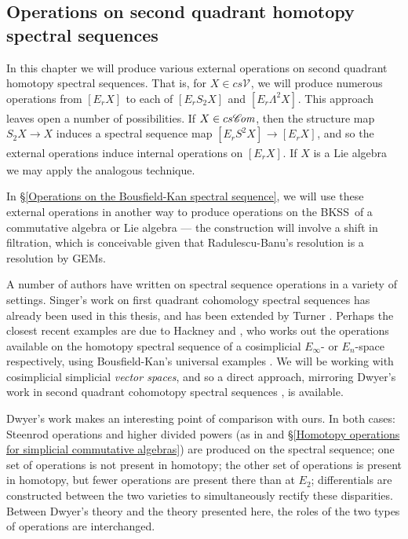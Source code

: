 \documentclass[11pt]{amsart} \renewcommand{\baselinestretch}{1.2}
\theoremstyle{plain}
\numberwithin{equation}{section} %
\theoremstyle{plain}
\numberwithin{equation}{chapter} %
\renewcommand{\to}{\longrightarrow}
\newcommand{\scrC}{\mathscr{C}}
\newcommand{\calV}{\mathcal{V}}
\newcommand{\vect}[2]{\calV^{#1}_{#2}}
\newcommand{\ExtCohOp}{\mathrm{Sq}_\mathrm{ext}}
\newcommand{\hExtCohOp}{\mathrm{Sq}_\mathrm{h,ext}}
\newcommand{\algs}{{\scrC\!\textit{\normalfont\textit{om}}}}
\newcommand{\E}[5]{[E^{#1}_{#2}#3]^{#4}_{#5}}
\newcommand{\uver}{^\mathrm{v}}
\newcommand{\dhor}{_\mathrm{h}}
\newcommand{\BKSS}{BKSS}
\newcommand{\SectionOrChapter}[1]{\section{\textbf{#1}}}
\begin{document}
\begin{second quadrant homotopy sseq operations}

\SectionOrChapter{Operations on second quadrant homotopy spectral sequences}
\label{second quadrant homotopy sseq operations}


In this chapter we will produce various external operations on second quadrant homotopy spectral sequences. That is, for $X\in cs\vect{}{}$, we will produce numerous operations
from $\E{}{r}{X}{}{}$ to each of $\E{}{r}{S_2X}{}{}$ and $\E{}{r}{\Lambda^2 X}{}{}$. This approach leaves open a number of possibilities. If $X\in cs\algs$, then the structure map $S_2X\to X$ induces a spectral sequence map $\E{}{r}{S^2X}{}{}\to \E{}{r}{X}{}{}$, and so the external operations induce internal operations on $\E{}{r}{X}{}{}$. If $X$ is a Lie algebra  we may apply the analogous technique. 

In \S\ref{Operations on the Bousfield-Kan spectral sequence}, we will use these external operations in another way to produce operations on the \BKSS\ of a commutative algebra or Lie algebra --- the construction will involve a shift in filtration, which is conceivable given that  Radulescu-Banu's resolution  is a resolution by GEMs.




A number of authors have written on spectral sequence operations in a variety of settings. Singer's work \cite{MR2245560} on first quadrant cohomology spectral sequences has already been used in this thesis, and has been extended by Turner \cite{turner_opns_and_sseqs_I.pdf}. 
 Perhaps the closest recent examples are due to Hackney \cite{MR3019742} and \cite{MR3171258}, who works out the operations available on the homotopy spectral sequence of a cosimplicial $E_\infty$- or $E_n$-space respectively, using Bousfield-Kan's universal examples \cite{BK_pairings.pdf}. We will be working with cosimplicial simplicial \emph{vector spaces}, and so a direct approach, mirroring Dwyer's work in second quadrant cohomotopy spectral sequences \cite{DwyerHigherDividedSquares.pdf}, is available. 

Dwyer's work makes an interesting point of comparison with ours. In both cases: Steenrod operations and higher divided powers (as in \cite{DwyerHigherDividedSquares.pdf} and \S\ref{Homotopy operations for simplicial commutative algebras}) are produced on the spectral sequence; one set of operations is not present in homotopy;  the other set of operations is present in homotopy, but fewer operations are present there than at $E_2$; differentials are constructed between the two varieties to simultaneously rectify these disparities. Between Dwyer's theory and the theory presented here, the roles of the two types of operations are interchanged.


\end{second quadrant homotopy sseq operations}
\end{document}
